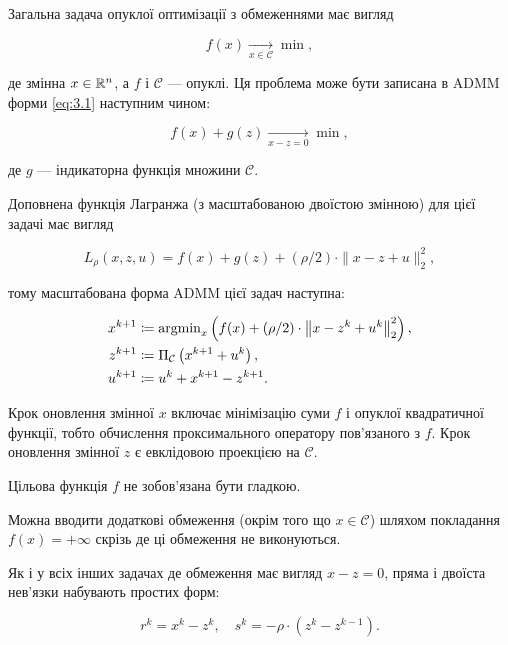 Загальна задача опуклої оптимізації з обмеженнями має вигляд

\begin{equation}
	f(x) \xrightarrow[x \in \mathcal{C}]{} \min,
\end{equation}

де змінна $x \in \mathbb{R}^n$, а $f$ і $\mathcal{C}$ --- опуклі. Ця проблема може бути записана в ADMM форми \eqref{eq:3.1} наступним чином:

\begin{equation}
	f(x) + g(z) \xrightarrow[x - z = 0]{} \min,
\end{equation}

де $g$ --- індикаторна функція множини $\mathcal{C}$. \medskip

Доповнена функція Лагранжа (з масштабованою двоїстою змінною) для цієї задачі має вигляд

\begin{equation}
	L_\rho(x, z, u) = f(x) + g(z) + (\rho / 2) \cdot \|x - z + u\|_2^2,
\end{equation}

тому масштабована форма ADMM цієї задач наступна:

\begin{align}
	x^{k + 1} &\coloneqq \operatorname{argmin}_x \left( f(x) + (\rho / 2) \cdot \left\|x - z^k + u^k\right\|_2^2 \right), \\
	z^{k + 1} &\coloneqq \Pi_\mathcal{C} \left( x^{k + 1} + u^k \right), \\
	u^{k + 1} &\coloneqq u^k + x^{k + 1} - z^{k + 1}.
\end{align}

Крок оновлення змінної $x$ включає мінімізацію суми $f$ і опуклої квадратичної функції, тобто обчислення проксимального оператору пов'язаного з $f$. Крок оновлення змінної $z$ є евклідовою проекцією на $\mathcal{C}$. 

\begin{remark}
	Цільова функція $f$ не зобов'язана бути гладкою.
\end{remark}

\begin{example}
	Можна вводити додаткові обмеження (окрім того що $x \in \mathcal{C}$) шляхом покладання $f(x) = + \infty$ скрізь де ці обмеження не виконуються.
\end{example}

Як і у всіх інших задачах де обмеження має вигляд $x - z = 0$, пряма і двоїста нев'язки набувають простих форм:

\begin{equation}
	r^k = x^k - z^k, \quad s^k = - \rho \cdot \left(z^k - z^{k - 1} \right).
\end{equation}

